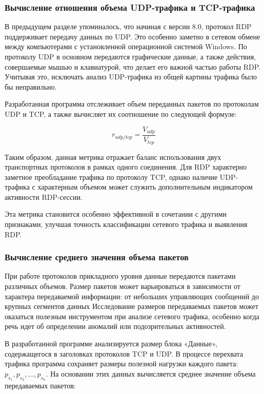 \documentclass[bachelor, och, coursework]{SCWorks}
\begin{document}
\subsubsection{Вычисление отношения объема UDP-трафика и TCP-трафика}

В предыдущем разделе упоминалось, что начиная с версии 8.0, протокол RDP поддерживает передачу данных по UDP. Это особенно заметно в 
сетевом обмене между компьютерами с установленной операционной системой Windows. По протоколу UDP в основном передаются графические данные, 
а также действия, совершаемые мышью и клавиатурой, что делает его важной частью работы RDP. Учитывая это, исключать анализ UDP-трафика из 
общей картины трафика было бы неправильно.

Разработанная программа отслеживает объем переданных пакетов по протоколам UDP и TCP, а также вычисляет их соотношение по следующей формуле:

\begin{equation}
  r_{udp/tcp} = \frac{V_{udp}}{V_{tcp}}
\end{equation}

Таким образом, данная метрика отражает баланс использования двух транспортных протоколов в рамках одного соединения. Для RDP характерно 
заметное преобладание трафика по протоколу TCP, однако наличие UDP-трафика с характерным объемом может служить дополнительным индикатором 
активности RDP-сессии.

Эта метрика становится особенно эффективной в сочетании с другими признаками, улучшая точность классификации сетевого трафика и выявления RDP.

\subsubsection{Вычисление среднего значения объема пакетов}

При работе протоколов прикладного уровня данные передаются пакетами различных объемов. 
Размер пакетов может варьироваться в зависимости от характера передаваемой информации: от небольших управляющих сообщений до крупных сегментов данных
Исследование размеров передаваемых пакетов может оказаться полезным инструментом при анализе сетевого 
трафика, особенно когда речь идет об определении аномалий или подозрительных активностей.


В разработанной программе анализируется размер блока «Данные», содержащегося в заголовках протоколов TCP и UDP. В процессе перехвата 
трафика программа сохраняет размеры полезной нагрузки каждого пакета: $p_{s_1}, p_{s_2}, \dots, p_{s_n}$. На основании этих данных 
вычисляется среднее значение объема передаваемых пакетов:
\end{document}
